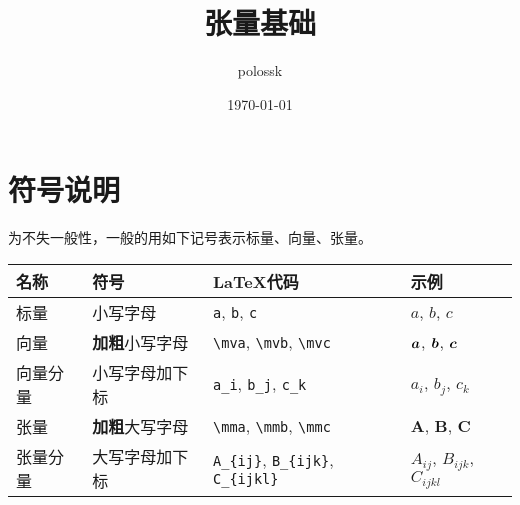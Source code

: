 \documentclass{article}
\title{张量基础}
\author{polossk}
\date{\today}
\begin{document}
\maketitle
\small\tableofcontents
\thispagestyle{fancy}
\renewcommand{\baselinestretch}{1.25}
\fSong\normalsize
\nocite{MathSymbolsinLaTeXbypolossk}

\section{符号说明}
为不失一般性，一般的用如下记号表示标量、向量、张量。

\begin{longtable}[]{@{}llll@{}}
    \toprule
    名称                    & 符号                  & \LaTeX 代码                                                            & 示例      \\
    \midrule
    标量                    & 小写字母              & \lstinline`a`, \lstinline`b`, \lstinline`c` & $a$, $b$,
    $c$                                                                                                                                  \\
    向量                    & \textbf{加粗}小写字母 &
    \lstinline`\mva`,
    \lstinline`\mvb`,
    \lstinline`\mvc`  & ${\bm a}$,
    ${\bm b}$, ${\bm c}$                                                                                                                       \\
    向量分量                & 小写字母加下标        & \lstinline`a_i`, \lstinline`b_j`, \lstinline`c_k`
                            & $a_i$, $b_j$, $c_k$                                                                                        \\
    张量                    & \textbf{加粗}大写字母 &
    \lstinline`\mma`,
    \lstinline`\mmb`,
    \lstinline`\mmc` & ${\bm A}$,
    ${\bm B}$, ${\bm C}$                                                                                                                 \\
    张量分量                & 大写字母加下标        & \lstinline`A_{ij}`, \lstinline`B_{ijk}`,
    \lstinline`C_{ijkl}` & $A_{ij}$, $B_{ijk}$,
    $C_{ijkl}$                                                                                                                           \\
    \bottomrule
\end{longtable}
\end{document}
